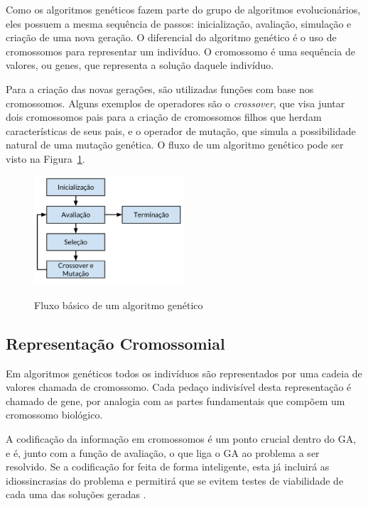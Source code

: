 \documentclass[12pt,oneside,a4paper,english,french,spanish,brazil,]{abntex2}
\begin{document}
Como os algoritmos genéticos fazem parte do grupo de algoritmos evolucionários, eles possuem a mesma sequência de passos: inicialização, avaliação, simulação e criação de uma nova geração. O diferencial do algoritmo genético é o uso de cromossomos para representar um indivíduo. O cromossomo é uma sequência de valores, ou genes, que representa a solução daquele indivíduo.

Para a criação das novas gerações, são utilizadas funções com base nos cromossomos. Alguns exemplos de operadores são o \textit{crossover}, que visa juntar dois cromossomos pais para a criação de cromossomos filhos que herdam características de seus pais, e o operador de mutação, que simula a possibilidade natural de uma mutação genética. O fluxo de um algoritmo genético pode ser visto na Figura~\ref{fig:GA_Fluxo}.

\begin{figure}[ht]
\centering
\caption{Fluxo básico de um algoritmo genético}
\includegraphics[width=0.5\textwidth]{imagens/GA_Fluxo.pdf}
\label{fig:GA_Fluxo}
\end{figure}

\subsection{Representação Cromossomial}

Em algoritmos genéticos todos os indivíduos são representados por uma cadeia de valores chamada de cromossomo. Cada pedaço indivisível desta representação é chamado de gene, por analogia com as partes fundamentais que compõem um cromossomo biológico.

A codificação da informação em cromossomos é um ponto crucial dentro do GA, e é, junto com a função de avaliação, o que liga o GA ao problema a ser resolvido. Se a codificação for feita de forma inteligente, esta já incluirá as idiossincrasias do problema e permitirá que se evitem testes de viabilidade de cada uma das soluções geradas \cite{linden:2008}.
\end{document}
